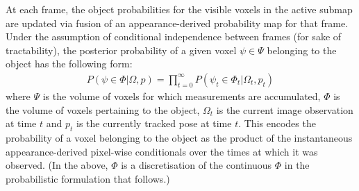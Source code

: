 At each frame, the object probabilities for the visible voxels in the active submap are updated via fusion of an appearance-derived probability map for that frame. Under the assumption of conditional independence between frames (for sake of tractability), the posterior probability of a given voxel $\psi \in \Psi$ belonging to the object has the following form:
\begin{equation}
\begin{split}
P(\psi \in \Phi | \Omega, p) = \prod_{t=0}^{\infty} P(\psi_{t} \in \Phi_{t} | \Omega_{t}, p_{t})
\end{split}
\end{equation}
where $\Psi$ is the volume of voxels for which measurements are accumulated, $\Phi$ 
is the volume of voxels pertaining to the object, $\Omega_{t}$ is the current image observation at time $t$ and $p_{t}$ is the 
currently tracked pose at time $t$.
This encodes the probability of a voxel belonging to the object as the product of the instantaneous appearance-derived pixel-wise conditionals over the times at which it was observed.
(In the above,
$\Phi$ is a discretisation of the continuous $\Phi$ in the probabilistic formulation that follows.)

